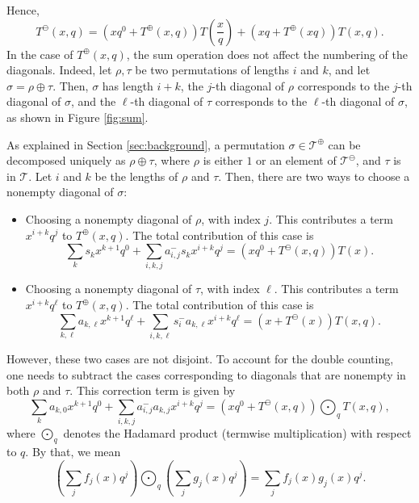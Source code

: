 \documentclass{article}
\theoremstyle{plain}
\theoremstyle{definition}
\theoremstyle{plain}
\begin{document}
Hence,
\begin{equation}\label{eq:skew-sum}
    T^\ominus(x,q) = \left(xq^0 + T^\oplus(x,q)\right)T\left(\frac{x}{q}\right) + \left(xq + T^\oplus(xq)\right)T(x,q).
\end{equation}
In the case of $T^\oplus(x,q)$, the sum operation does not affect the numbering of the diagonals. Indeed, let $\rho,\tau$ be two permutations of lengths $i$ and $k$, and let $\sigma = \rho\oplus\tau$. Then, $\sigma$ has length $i + k$, the $j$-th diagonal of $\rho$ corresponds to the $j$-th diagonal of $\sigma$, and the $\ell$-th diagonal of $\tau$ corresponds to the $\ell$-th diagonal of $\sigma$, as shown in Figure \ref{fig:sum}.

As explained in Section \ref{sec:background}, a permutation $\sigma\in\mathcal{T}^\oplus$ can be decomposed uniquely as $\rho\oplus\tau$, where $\rho$ is either $1$ or an element of $\mathcal{T}^\ominus$, and $\tau$ is in $\mathcal{T}$. Let $i$ and $k$ be the lengths of $\rho$ and $\tau$. Then, there are two ways to choose a nonempty diagonal of $\sigma$:
\begin{itemize}
    \item Choosing a nonempty diagonal of $\rho$, with index $j$. This contributes a term $x^{i + k}q^j$ to $T^\oplus(x,q)$. The total contribution of this case is
    \begin{equation*}
        \sum_k s_kx^{k + 1}q^0 + \sum_{i, k, j} a_{i,j}^-s_kx^{i + k}q^j = \left(xq^0 + T^\ominus(x,q)\right)T(x).
    \end{equation*}
    \item Choosing a nonempty diagonal of $\tau$, with index $\ell$. This contributes a term $x^{i + k}q^\ell$ to $T^\oplus(x,q)$. The total contribution of this case is
    \begin{equation*}
        \sum_{k, \ell} a_{k,\ell}x^{k + 1}q^\ell + \sum_{i, k, \ell} s_i^-a_{k,\ell}x^{i + k}q^\ell = \left(x + T^\ominus(x)\right)T(x,q).
    \end{equation*}
\end{itemize}
However, these two cases are not disjoint. To account for the double counting, one needs to subtract the cases corresponding to diagonals that are nonempty in both $\rho$ and $\tau$. This correction term is given by
\begin{equation*}
    \sum_k a_{k,0}x^{k + 1}q^0 + \sum_{i, k, j} a_{i,j}^-a_{k,j}x^{i + k}q^j = \left(xq^0 + T^\ominus(x,q)\right)\bigodot_q T(x,q),
\end{equation*}
where $\bigodot_q$ denotes the Hadamard product (termwise multiplication) with respect to $q$. By that, we mean
\begin{equation*}
    \left( \sum_j f_j(x) q^j \right) \bigodot_q
    \left( \sum_j g_j(x) q^j \right) = \sum_j f_j(x) g_j(x) q^j.
\end{equation*}
\end{document}
